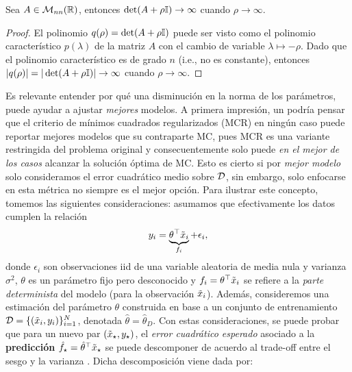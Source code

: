 \begin{lemma}
	Sea $A\in\mathcal{M}_{nn}(\mathbb{R})$, entonces $\det(A+\rho{\mathbb I})\to \infty$ cuando $\rho\to\infty$.
\end{lemma}

\begin{proof}
	El polinomio $q(\rho)=\det(A+\rho{\mathbb I})$ puede ser visto como el polinomio característico $p(\lambda)$ de la matriz $A$ con el cambio de variable $\lambda\mapsto -\rho$. Dado que el polinomio característico es de grado $n$ (i.e., no es constante), entonces $|q(\rho)|=|\det(A+\rho{\mathbb I})|\to\infty$ cuando $\rho\to\infty$.
\end{proof}

Es relevante entender por qué una disminución en la norma de los parámetros, puede ayudar a ajustar \emph{mejores} modelos. A primera impresión, un podría pensar que el criterio de mínimos cuadrados regularizados (MCR) en ningún caso puede reportar mejores modelos que su contraparte MC, pues MCR es una variante restringida del problema original y consecuentemente solo puede \emph{en el mejor de los casos} alcanzar la solución óptima de MC. Esto es cierto si por \emph{mejor modelo} solo consideramos el error cuadrático medio sobre ${\mathcal D}$, sin embargo, solo enfocarse en esta métrica no siempre es el mejor opción. Para ilustrar este concepto, tomemos las siguientes consideraciones: asumamos que efectivamente los datos cumplen la relación
\begin{equation}
	y_i = \underbrace{\theta^\top\tilde{x}_i}_{f_i} + \epsilon_i,	
 \end{equation}
 donde $\epsilon_i$ son observaciones iid de una variable aleatoria de media nula y varianza $\sigma^2$, $\theta$ es un parámetro fijo pero desconocido y $f_i= \theta^\top\tilde{x}_i$ se refiere a la  \emph{parte determinista} del modelo (para la observación $\tilde{x}_i$). Además, consideremos una estimación del parámetro $\theta$ construida en base a un conjunto de entrenamiento ${\mathcal D}=\{(\tilde{x}_i,y_i)\}_{i=1}^N$, denotada $\hat\theta=\hat\theta_D$. Con estas consideraciones, se puede probar que para un nuevo par $(\tilde{x}_\star,y_\star)$, el \emph{error cuadrático esperado} asociado a la \textbf{predicción} $\hat f_\star = \hat\theta^\top \tilde{x}_\star$ se puede descomponer de acuerdo al trade-off entre el sesgo y la varianza \cite{ISLbook}. Dicha descomposición viene dada por:
 
